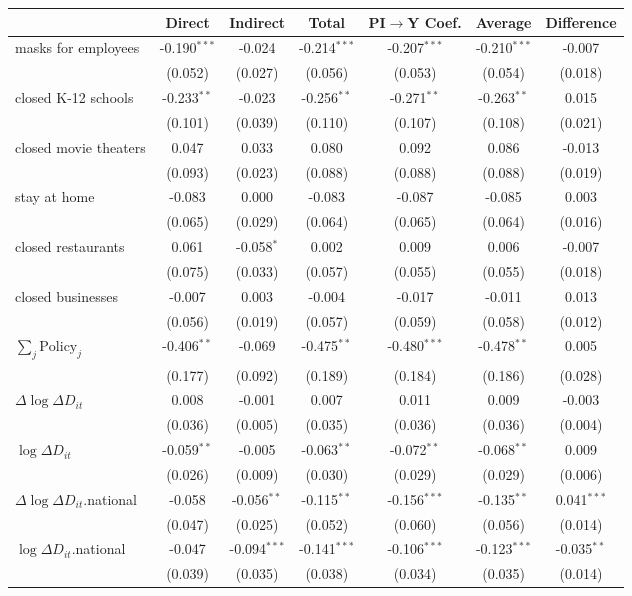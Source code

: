 
\begin{tabular}{lccccc|>{}c}
\toprule
  & Direct & Indirect & Total & PI$\to$Y Coef. & Average & Difference\\
\midrule
masks for employees & -0.190$^{***}$ & -0.024 & -0.214$^{***}$ & -0.207$^{***}$ & -0.210$^{***}$ & -0.007\\
 & (0.052) & (0.027) & (0.056) & (0.053) & (0.054) & (0.018)\\
closed K-12 schools & -0.233$^{**}$ & -0.023 & -0.256$^{**}$ & -0.271$^{**}$ & -0.263$^{**}$ & 0.015\\
 & (0.101) & (0.039) & (0.110) & (0.107) & (0.108) & (0.021)\\
closed movie theaters & 0.047 & 0.033 & 0.080 & 0.092 & 0.086 & -0.013\\
 & (0.093) & (0.023) & (0.088) & (0.088) & (0.088) & (0.019)\\
stay at home & -0.083 & 0.000 & -0.083 & -0.087 & -0.085 & 0.003\\
 & (0.065) & (0.029) & (0.064) & (0.065) & (0.064) & (0.016)\\
closed restaurants & 0.061 & -0.058$^{*}$ & 0.002 & 0.009 & 0.006 & -0.007\\
 & (0.075) & (0.033) & (0.057) & (0.055) & (0.055) & (0.018)\\
closed businesses & -0.007 & 0.003 & -0.004 & -0.017 & -0.011 & 0.013\\
 & (0.056) & (0.019) & (0.057) & (0.059) & (0.058) & (0.012)\\
$\sum_j \mathrm{Policy}_j$ & -0.406$^{**}$ & -0.069 & -0.475$^{**}$ & -0.480$^{***}$ & -0.478$^{**}$ & 0.005\\
 & (0.177) & (0.092) & (0.189) & (0.184) & (0.186) & (0.028)\\
$\Delta \log \Delta D_{it}$ & 0.008 & -0.001 & 0.007 & 0.011 & 0.009 & -0.003\\
 & (0.036) & (0.005) & (0.035) & (0.036) & (0.036) & (0.004)\\
$\log \Delta D_{it}$ & -0.059$^{**}$ & -0.005 & -0.063$^{**}$ & -0.072$^{**}$ & -0.068$^{**}$ & 0.009\\
 & (0.026) & (0.009) & (0.030) & (0.029) & (0.029) & (0.006)\\
$\Delta \log \Delta D_{it}$.national & -0.058 & -0.056$^{**}$ & -0.115$^{**}$ & -0.156$^{***}$ & -0.135$^{**}$ & 0.041$^{***}$\\
 & (0.047) & (0.025) & (0.052) & (0.060) & (0.056) & (0.014)\\
$\log \Delta D_{it}$.national & -0.047 & -0.094$^{***}$ & -0.141$^{***}$ & -0.106$^{***}$ & -0.123$^{***}$ & -0.035$^{**}$\\
 & (0.039) & (0.035) & (0.038) & (0.034) & (0.035) & (0.014)\\
\bottomrule
\end{tabular}